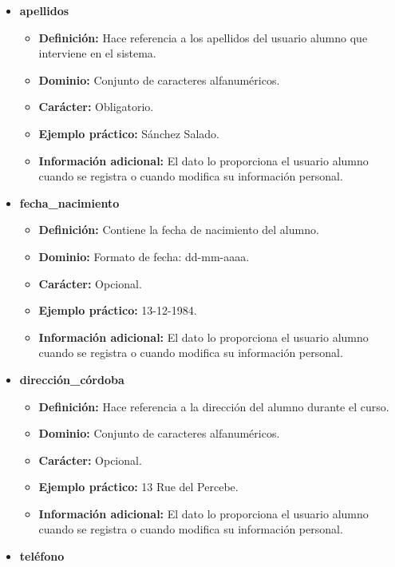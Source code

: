 \begin{description}
\begin{itemize}
\begin{itemize}
      \end{itemize}
   \item \textbf{apellidos}
      \begin{itemize}
         \item \textbf{Definición:} Hace referencia a los apellidos del usuario alumno que interviene en el sistema.
         \item \textbf{Dominio:} Conjunto de caracteres alfanuméricos.
         \item \textbf{Carácter:}  Obligatorio.
         \item \textbf{Ejemplo práctico:} Sánchez Salado.
         \item \textbf{Información adicional:} El dato lo proporciona el usuario alumno cuando se registra o cuando modifica su información personal.
      \end{itemize}
   \item \textbf{fecha\_nacimiento}
      \begin{itemize}
         \item \textbf{Definición:} Contiene la fecha de nacimiento del alumno.
         \item \textbf{Dominio:} Formato de fecha: dd-mm-aaaa.
         \item \textbf{Carácter:}  Opcional.
         \item \textbf{Ejemplo práctico:} 13-12-1984.
         \item \textbf{Información adicional:} El dato lo proporciona el usuario alumno cuando se registra o cuando modifica su información personal.
      \end{itemize}
   \item \textbf{dirección\_córdoba}
      \begin{itemize}
         \item \textbf{Definición:} Hace referencia a la dirección del alumno durante el curso.
         \item \textbf{Dominio:} Conjunto de caracteres alfanuméricos.
         \item \textbf{Carácter:}  Opcional.
         \item \textbf{Ejemplo práctico:} 13 Rue del Percebe.
         \item \textbf{Información adicional:} El dato lo proporciona el usuario alumno cuando se registra o cuando modifica su información personal.
      \end{itemize}
   \item \textbf{teléfono}
      \begin{itemize}

\end{itemize}
\end{itemize}
\end{description}
